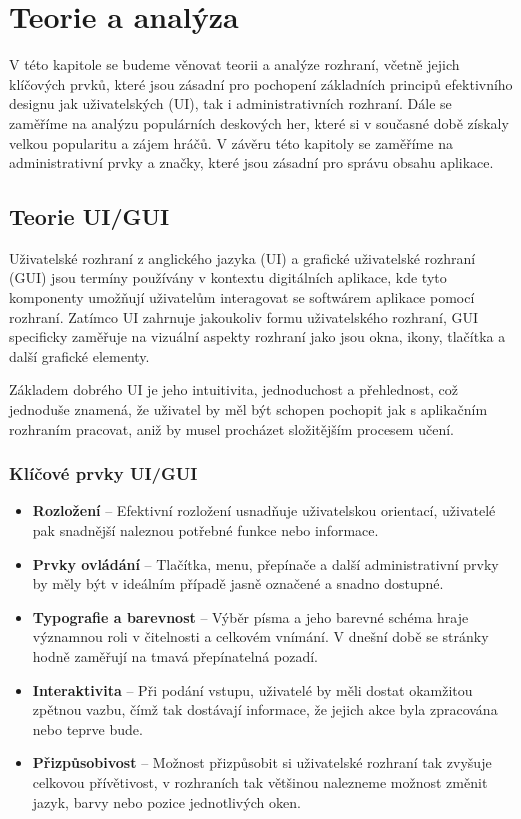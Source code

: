 \chapter{Teorie a analýza}
\label{ch:theory_and_analysis}
V této kapitole se budeme věnovat teorii a analýze rozhraní, včetně jejich klíčových prvků, které jsou zásadní pro pochopení základních principů efektivního designu jak uživatelských (UI), tak i administrativních rozhraní. Dále se zaměříme na analýzu populárních deskových her, které si v současné době získaly velkou popularitu a zájem hráčů. V závěru této kapitoly se zaměříme na administrativní prvky a značky, které jsou zásadní pro správu obsahu aplikace.

\section{Teorie UI/GUI}
\label{sec:ui-gui-theory}
Uživatelské rozhraní z anglického jazyka \textit{} (UI) a grafické uživatelské rozhraní \textit{} (GUI) jsou termíny používány v kontextu digitálních aplikace, kde tyto komponenty umožňují uživatelům interagovat se softwárem aplikace pomocí rozhraní. Zatímco UI zahrnuje jakoukoliv formu uživatelského rozhraní, GUI specificky zaměřuje na vizuální aspekty rozhraní jako jsou okna, ikony, tlačítka a další grafické elementy.

Základem dobrého UI je jeho intuitivita, jednoduchost a přehlednost, což jednoduše znamená, že uživatel by měl být schopen pochopit jak s aplikačním rozhraním pracovat, aniž by musel procházet složitějším procesem učení.

\subsection*{Klíčové prvky UI/GUI}
\label{subsec:ui-gui-theory-key-elements}
\begin{itemize}
    \item \textbf{Rozložení} -- Efektivní rozložení usnadňuje uživatelskou orientací, uživatelé pak snadnější naleznou potřebné funkce nebo informace.
    \item \textbf{Prvky ovládání} -- Tlačítka, menu, přepínače a další administrativní prvky by měly být v ideálním případě jasně označené a snadno dostupné.
    \item \textbf{Typografie a barevnost} -- Výběr písma a jeho barevné schéma hraje významnou roli v čitelnosti a celkovém vnímání. V dnešní době se stránky hodně zaměřují na tmavá přepínatelná pozadí.
    \item \textbf{Interaktivita} -- Při podání vstupu, uživatelé by měli dostat okamžitou zpětnou vazbu, čímž tak dostávají informace, že jejich akce byla zpracována nebo teprve bude.
    \item \textbf{Přizpůsobivost} -- Možnost přizpůsobit si uživatelské rozhraní tak zvyšuje celkovou přívětivost, v rozhraních tak většinou nalezneme možnost změnit jazyk, barvy nebo pozice jednotlivých oken.
\end{itemize}

